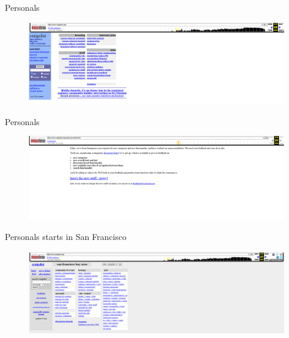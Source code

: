 \documentclass{beamer}
\begin{document}
\begin{frame}{Personals}

\begin{figure}
    \centering
    \includegraphics[height=0.85\textheight]{./lecture_includes/melanie1}
\end{figure}

\end{frame}


\begin{frame}{Personals}
\begin{figure}
    \centering
    \includegraphics[height=0.5\textheight]{./lecture_includes/melanie2}
\end{figure}

\end{frame}

\begin{frame}{Personals starts in San Francisco}
\begin{figure}
    \centering
    \includegraphics[height=0.85\textheight]{./lecture_includes/melanie3}
\end{figure}

\end{frame}
\end{document}
